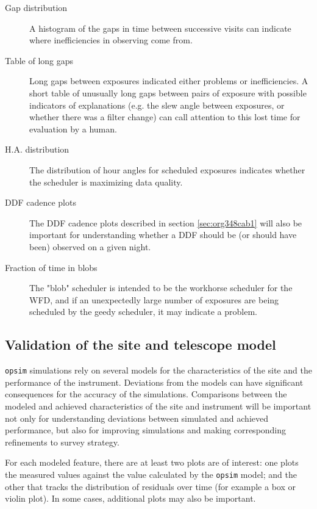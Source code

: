 \begin{description}
\item[{Gap distribution}] A histogram of the gaps in time between successive visits can indicate where inefficiencies in observing come from.
\item[{Table of long gaps}] Long gaps between exposures indicated either problems or inefficiencies. A short table of unusually long gaps between pairs of exposure with possible indicators of explanations (e.g. the slew angle between exposures, or whether there was a filter change) can call attention to this lost time for evaluation by a human.
\item[{H.A. distribution}] The distribution of hour angles for scheduled exposures indicates whether the scheduler is maximizing data quality.
\item[{DDF cadence plots}] The DDF cadence plots described in section \ref{sec:org348cab1} will also be important for understanding whether a DDF should be (or should have been) observed on a given night.
\item[{Fraction of time in blobs}] The "blob" scheduler is intended to be the workhorse scheduler for the WFD, and if an unexpectedly large number of exposures are being scheduled by the geedy scheduler, it may indicate a problem.
\end{description}

\subsection{Validation of the site and telescope model}
\label{sec:org38f1dc8}
\texttt{opsim} simulations rely on several models for the characteristics of the site and the performance of the instrument.
Deviations from the models can have significant consequences for the accuracy of the simulations.
Comparisons between the modeled and achieved characteristics of the site and instrument will be important not only for understanding deviations between simulated and achieved performance, but also for improving simulations and making corresponding refinements to survey strategy.

For each modeled feature, there are at least two plots are of interest: one plots the measured values against the value calculated by the \texttt{opsim} model; and the other that tracks the distribution of residuals over time (for example a box or violin plot).
In some cases, additional plots may also be important.

